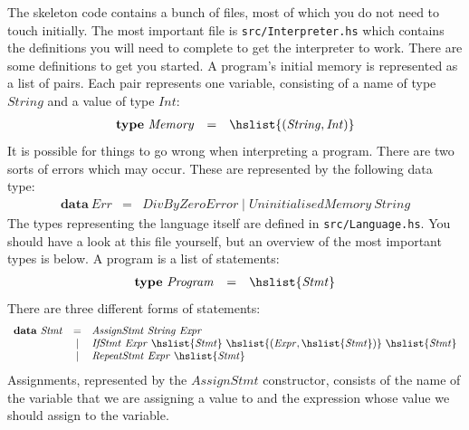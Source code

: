 \documentclass{cs256-shared/cs256}
\begin{document}
The skeleton code contains a bunch of files, most of which you do not need to touch initially. The most important file is \texttt{src/Interpreter.hs} which contains the definitions you will need to complete to get the interpreter to work. There are some definitions to get you started. A program's initial memory is represented as a list of pairs. Each pair represents one variable, consisting of a name of type $\mathit{String}$ and a value of type $\mathit{Int}$:
\begin{displaymath}
\begin{array}{lcl}
\mathbf{type}~\mathit{Memory} & = & \hslist{(\mathit{String}, \mathit{Int})}
\end{array}
\end{displaymath}
It is possible for things to go wrong when interpreting a program. There are two sorts of errors which may occur. These are represented by the following data type:
\begin{displaymath}
\begin{array}{lcl}
\mathbf{data}~\mathit{Err} & = & \mathit{DivByZeroError} \mid \mathit{UninitialisedMemory}~\mathit{String}
\end{array}
\end{displaymath}
The types representing the language itself are defined in \texttt{src/Language.hs}. You should have a look at this file yourself, but an overview of the most important types is below. A program is a list of statements:
\begin{displaymath}
\begin{array}{lcl}
\mathbf{type}~\mathit{Program} & = & \hslist{\mathit{Stmt}}
\end{array}
\end{displaymath}
There are three different forms of statements: 
\begin{displaymath}
\begin{array}{lcl}
\mathbf{data}~\mathit{Stmt} & = & \mathit{AssignStmt}~\mathit{String}~\mathit{Expr} \\
& \mid & \mathit{IfStmt}~\mathit{Expr}~\hslist{\mathit{Stmt}}~\hslist{(\mathit{Expr},\hslist{\mathit{Stmt}})}~\hslist{\mathit{Stmt}} \\
& \mid & \mathit{RepeatStmt}~\mathit{Expr}~\hslist{\mathit{Stmt}}
\end{array}
\end{displaymath}
Assignments, represented by the $\mathit{AssignStmt}$ constructor, consists of the name of the variable that we are assigning a value to and the expression whose value we should assign to the variable. 
\end{document}
